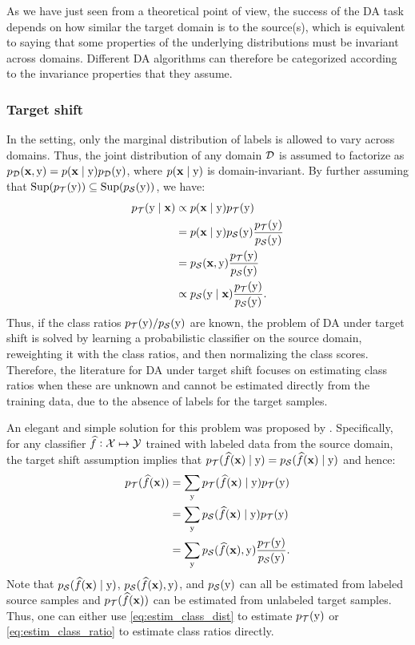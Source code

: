 As we have just seen from a theoretical point of view, the success of the DA task depends on how similar the target domain is to the source(s), which is equivalent to saying that some properties of the underlying distributions must be invariant across domains. Different DA algorithms can therefore be categorized according to the invariance properties that they assume.

\subsubsection{Target shift}
\label{sec:target_shift_sota}
In the  setting, only the marginal distribution of labels is allowed to vary across domains. Thus, the joint distribution of any domain ${\mathcal{D}}$ is assumed to factorize as $p_{\mathcal{D}}({\mathbf{x}}, {\textnormal{y}}) = p({\mathbf{x}} \mid {\textnormal{y}}) p_{\mathcal{D}}({\textnormal{y}})$, where $p({\mathbf{x}} \mid {\textnormal{y}})$ is domain-invariant. By further assuming that $\mathrm{Sup}(p_{\mathcal{T}}({\textnormal{y}})) \subseteq \mathrm{Sup}(p_{\mathcal{S}}({\textnormal{y}}))$, we have:
\begin{align}
	p_{\mathcal{T}}({\textnormal{y}} \mid {\mathbf{x}}) &\propto p({\mathbf{x}} \mid {\textnormal{y}}) p_{\mathcal{T}}({\textnormal{y}}) \nonumber\\
	&= p({\mathbf{x}} \mid {\textnormal{y}}) p_{\mathcal{S}}({\textnormal{y}}) \frac{p_{\mathcal{T}}({\textnormal{y}})}{p_{\mathcal{S}}({\textnormal{y}})} \nonumber\\
	&= p_{\mathcal{S}}({\mathbf{x}} , {\textnormal{y}}) \frac{p_{\mathcal{T}}({\textnormal{y}})}{p_{\mathcal{S}}({\textnormal{y}})} \nonumber\\
	&\propto p_{\mathcal{S}}({\textnormal{y}} \mid {\mathbf{x}}) \frac{p_{\mathcal{T}}({\textnormal{y}})}{p_{\mathcal{S}}({\textnormal{y}})}.
\end{align}
Thus, if the class ratios $p_{\mathcal{T}}({\textnormal{y}})/p_{\mathcal{S}}({\textnormal{y}})$ are known, the problem of DA under target shift is solved by learning a probabilistic classifier on the source domain, reweighting it with the class ratios, and then normalizing the class scores. Therefore, the literature for DA under target shift focuses on estimating class ratios when these are unknown and cannot be estimated directly from the training data, due to the absence of labels for the target samples.

An elegant and simple solution for this problem was proposed by \citet{Lipton2018}. Specifically, for any classifier $\widehat{f}: {\mathcal{X}} \mapsto {\mathcal{Y}}$ trained with labeled data from the source domain, the target shift assumption implies that $p_{{\mathcal{T}}}(\widehat{f}({\mathbf{x}}) \mid {\textnormal{y}}) = p_{{\mathcal{S}}}(\widehat{f}({\mathbf{x}}) \mid {\textnormal{y}})$ and hence:
\begin{align}
p_{\gT}(\widehat{f}(\rvx)) &= \sum_{\ry} p_{\gT}(\widehat{f}(\rvx) \mid \ry) p_{\gT}(\ry) \nonumber\\
\allowdisplaybreaks
&= \sum_{\ry} p_{\gS}(\widehat{f}(\rvx) \mid \ry) p_{\gT}(\ry) \label{eq:estim_class_dist}\\
\allowdisplaybreaks
&= \sum_{\ry} p_{\gS}(\widehat{f}(\rvx), \ry) \frac{p_{\gT}(\ry)}{p_{\gS}(\ry)}. \label{eq:estim_class_ratio}
\end{align}
Note that $p_{{\mathcal{S}}}(\widehat{f}({\mathbf{x}}) \mid {\textnormal{y}})$, $p_{{\mathcal{S}}}(\widehat{f}({\mathbf{x}}), {\textnormal{y}})$, and $p_{{\mathcal{S}}}({\textnormal{y}})$ can all be estimated from labeled source samples and $p_{{\mathcal{T}}}(\widehat{f}({\mathbf{x}}))$ can be estimated from unlabeled target samples. Thus, one can either use \eqref{eq:estim_class_dist} to estimate $p_{{\mathcal{T}}}({\textnormal{y}})$ or \eqref{eq:estim_class_ratio} to estimate class ratios directly.

